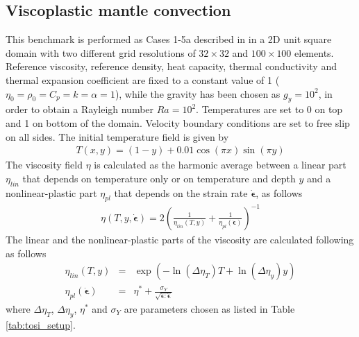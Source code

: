 \subsection{Viscoplastic mantle convection}\label{sec:visco_mantle}
This benchmark is performed as Cases 1-5a described in \citet{Tosi2015} in a 2D unit square domain with two different grid resolutions of $32\times32$ and $100\times100$ elements. Reference viscosity, reference density, heat capacity, thermal conductivity and thermal expansion coefficient are fixed to a constant
value of 1 ($\eta_0= \rho_0= C_p = k=\alpha=1$), while the gravity has been chosen as $g_y=10^2$, in order to obtain a Rayleigh number $Ra=10^2$. Temperatures
are set to 0 on top and 1 on bottom of the domain. Velocity boundary conditions are set to free slip on all sides. The initial temperature field is given by
\begin{eqnarray}
T(x,y)=(1-y)+0.01 \cos (\pi x) \sin (\pi y)\nonumber
\end{eqnarray}
The viscosity field $\eta$ is calculated as the harmonic average between a linear part $\eta_{lin}$ that depends on temperature only or on temperature and 
depth $y$ and a nonlinear-plastic part $\eta_{pl}$ that depends on the strain rate $\dot{\bm{\epsilon}}$, as follows
\begin{eqnarray}
\eta(T,y,\dot{\bm{\epsilon}})=2\left(\frac{1}{\eta_{lin}(T,y)}+\frac{1}{\eta_{pl}(\dot{\bm{\epsilon}})}\right)^{-1}\nonumber
\end{eqnarray}
The linear and the nonlinear-plastic parts of the viscosity are calculated following \citet{Tosi2015} as follows
\begin{eqnarray}
\eta_{lin}(T,y)&=&\exp(-\ln(\Delta\eta_T)T+\ln(\Delta\eta_y)y)\nonumber\\
\eta_{pl}(\dot{\bm{\epsilon}})&=&\eta^*+\frac{\sigma_Y}{\sqrt{\dot{\bm{\epsilon}}:\dot{\bm{\epsilon}}}}\nonumber
\end{eqnarray}
where $\Delta\eta_T$, $\Delta\eta_y$, $\eta^*$ and $\sigma_Y$ are parameters chosen as listed in Table \ref{tab:tosi_setup}.
